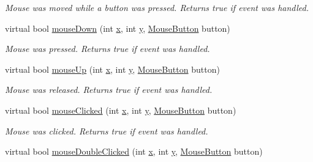 \begin{DoxyCompactItemize}
\begin{DoxyCompactList}\small\item\em Mouse was moved while a button was pressed. Returns true if event was handled. \end{DoxyCompactList}\item 
\hypertarget{classGUI_1_1Window_ad31c6dfb6d075046890a46b79b1b4ca1}{virtual bool \hyperlink{classGUI_1_1Window_ad31c6dfb6d075046890a46b79b1b4ca1}{mouse\-Down} (int \hyperlink{classGUI_1_1Window_a6ca6a80ca00c9e1d8ceea8d3d99a657d}{x}, int \hyperlink{classGUI_1_1Window_a0ee8e923aff2c3661fc2e17656d37adf}{y}, \hyperlink{namespaceGUI_ad06082a7b02aa73697f39eb8e0856de9}{Mouse\-Button} button)}\label{classGUI_1_1Window_ad31c6dfb6d075046890a46b79b1b4ca1}

\begin{DoxyCompactList}\small\item\em Mouse was pressed. Returns true if event was handled. \end{DoxyCompactList}\item 
\hypertarget{classGUI_1_1Window_a96c8b224c081a58dc4cd53192da1332b}{virtual bool \hyperlink{classGUI_1_1Window_a96c8b224c081a58dc4cd53192da1332b}{mouse\-Up} (int \hyperlink{classGUI_1_1Window_a6ca6a80ca00c9e1d8ceea8d3d99a657d}{x}, int \hyperlink{classGUI_1_1Window_a0ee8e923aff2c3661fc2e17656d37adf}{y}, \hyperlink{namespaceGUI_ad06082a7b02aa73697f39eb8e0856de9}{Mouse\-Button} button)}\label{classGUI_1_1Window_a96c8b224c081a58dc4cd53192da1332b}

\begin{DoxyCompactList}\small\item\em Mouse was released. Returns true if event was handled. \end{DoxyCompactList}\item 
virtual bool \hyperlink{classGUI_1_1Window_a9519fe8a8f08b5b70524d2230d209107}{mouse\-Clicked} (int \hyperlink{classGUI_1_1Window_a6ca6a80ca00c9e1d8ceea8d3d99a657d}{x}, int \hyperlink{classGUI_1_1Window_a0ee8e923aff2c3661fc2e17656d37adf}{y}, \hyperlink{namespaceGUI_ad06082a7b02aa73697f39eb8e0856de9}{Mouse\-Button} button)
\begin{DoxyCompactList}\small\item\em Mouse was clicked. Returns true if event was handled. \end{DoxyCompactList}\item 
\hypertarget{classGUI_1_1Window_a42d1c5fd68792cc1bfe551c9fcf76248}{virtual bool \hyperlink{classGUI_1_1Window_a42d1c5fd68792cc1bfe551c9fcf76248}{mouse\-Double\-Clicked} (int \hyperlink{classGUI_1_1Window_a6ca6a80ca00c9e1d8ceea8d3d99a657d}{x}, int \hyperlink{classGUI_1_1Window_a0ee8e923aff2c3661fc2e17656d37adf}{y}, \hyperlink{namespaceGUI_ad06082a7b02aa73697f39eb8e0856de9}{Mouse\-Button} button)}\label{classGUI_1_1Window_a42d1c5fd68792cc1bfe551c9fcf76248}


\end{DoxyCompactItemize}
